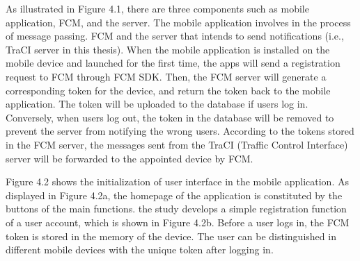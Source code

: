 \documentclass[12pt]{ksthesis}
\begin{document}
\begin{thesis}
{As illustrated in Figure 4.1, there are three components such as mobile application, FCM, and the server. The mobile application involves in the process of message passing.
FCM and the server that intends to send notifications (i.e., TraCI server in this thesis). 
When the mobile application is installed on the mobile device and launched for the first time, the apps will send a registration request to FCM through FCM SDK. Then, the FCM server will generate a corresponding token for the device, and return the token back to the mobile application. The token will be uploaded to the database if users log in. Conversely, when users log out, the token in the database will be removed to prevent the server from notifying the wrong users. According to the tokens stored in the FCM server, the messages sent from the TraCI (Traffic Control Interface) server will be forwarded to the appointed device by FCM.


Figure 4.2 shows the initialization of user interface in the mobile application. As displayed in Figure 4.2a, the homepage of the application is constituted by the buttons of the main functions. the study develops a simple registration function of a user account, which is shown in Figure 4.2b. 
Before a user logs in, the FCM token is stored in the memory of the device. The user can be distinguished in different mobile devices with the unique token after logging in.
 




}
\end{thesis}
\end{document}
